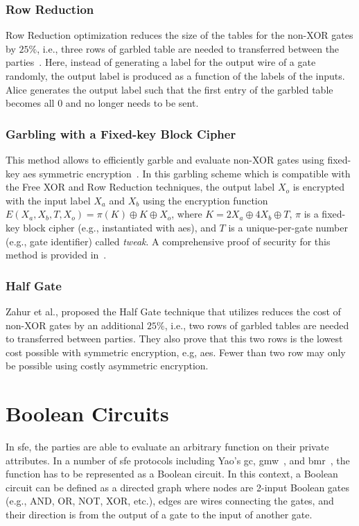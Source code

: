 \subsubsection{Row Reduction}\label{sssec:prelim-row}
Row Reduction optimization reduces the size of the tables for the non-XOR gates by $25\%$, i.e., three rows of garbled table are needed to transferred between the parties~\cite{naor1999privacy}.
Here, instead of generating a label for the output wire of a gate randomly, the output label is produced as a function of the labels of the inputs.
Alice generates the output label such that the first entry of the garbled table becomes all $0$ and no longer needs to be sent.

\subsubsection{Garbling with a Fixed-key Block Cipher}\label{sssec:prelim-aes}
This method allows to efficiently garble and evaluate non-XOR gates using fixed-key \acrfull{aes} symmetric encryption~\cite{bellare2013efficient}.
In this garbling scheme which is compatible with the Free XOR and Row Reduction techniques, the output label $X_{o}$ is encrypted with the input label $X_{a}$ and $X_{b}$ using the encryption function $E(X_a,X_b,T,X_o) = \pi(K) \oplus K \oplus X_o$, where $K=2X_a\oplus4X_b\oplus T$, $\pi$ is a fixed-key block cipher (e.g., instantiated with \acrshort{aes}), and $T$ is a unique-per-gate number (e.g., gate identifier) called \emph{tweak}.
A comprehensive proof of security for this method is provided in~\cite{bellare2013efficient}.

\subsubsection{Half Gate}\label{sssec:prelim-half}
Zahur et al., proposed the Half Gate technique that utilizes reduces the cost of non-XOR gates by an additional $25\%$, i.e., two rows of garbled tables are needed to transferred between parties\cite{zahur2015two}.
They also prove that this two rows is the lowest cost possible with symmetric encryption, e.g, \acrshort{aes}.
Fewer than two row may only be possible using costly asymmetric encryption.

\section{Boolean Circuits}\label{sec:prelim-circuit}
In \acrshort{sfe}, the parties are able to evaluate an arbitrary function on their private attributes.
In a number of \acrshort{sfe} protocols including Yao's \acrshort{gc}, \acrfull{gmw}~\cite{goldreich1987play}, and \acrfull{bmr}~\cite{beaver1990round}, the function has to be represented as a Boolean circuit.
In this context, a Boolean circuit can be defined as a directed graph where nodes are 2-input Boolean gates (e.g., AND, OR, NOT, XOR, etc.), edges are wires connecting the gates, and their direction is from the output of a gate to the input of another gate.

